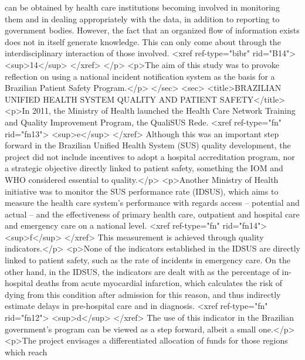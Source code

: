           can be obtained by health care institutions becoming involved in monitoring them and in
          dealing appropriately with the data, in addition to reporting to government bodies.
          However, the fact that an organized flow of information exists does not in itself generate
          knowledge. This can only come about through the interdisciplinary interaction of those
          involved. <xref ref-type="bibr" rid="B14">
            <sup>14</sup>
          </xref>
        </p>
        <p>The aim of this study was to provoke reflection on using a national incident notification
          system as the basis for a Brazilian Patient Safety Program.</p>
      </sec>
      <sec>
        <title>BRAZILIAN UNIFIED HEALTH SYSTEM QUALITY AND PATIENT SAFETY</title>
        <p>In 2011, the Ministry of Health launched the Health Care Network Training and Quality
          Improvement Program, the QualiSUS Rede. <xref ref-type="fn" rid="fn13">
            <sup>e</sup>
          </xref> Although this was an important step forward in the Brazilian Unified Health System
          (SUS) quality development, the project did not include incentives to adopt a hospital
          accreditation program, nor a strategic objective directly linked to patient safety,
          something the IOM and WHO considered essential to quality.</p>
        <p>Another Ministry of Health initiative was to monitor the SUS performance rate (IDSUS),
          which aims to measure the health care system’s performance with regards access – potential
          and actual – and the effectiveness of primary health care, outpatient and hospital care
          and emergency care on a national level. <xref ref-type="fn" rid="fn14">
            <sup>f</sup>
          </xref> This measurement is achieved through quality indicators.</p>
        <p>None of the indicators established in the IDSUS are directly linked to patient safety,
          such as the rate of incidents in emergency care. On the other hand, in the IDSUS, the
          indicators are dealt with as the percentage of in-hospital deaths from acute myocardial
          infarction, which calculates the risk of dying from this condition after admission for
          this reason, and thus indirectly estimate delays in pre-hospital care and in diagnosis.
            <xref ref-type="fn" rid="fn12">
            <sup>d</sup>
          </xref> The use of this indicator in the Brazilian government’s program can be viewed as a
          step forward, albeit a small one.</p>
        <p>The project envisages a differentiated allocation of funds for those regions which reach

